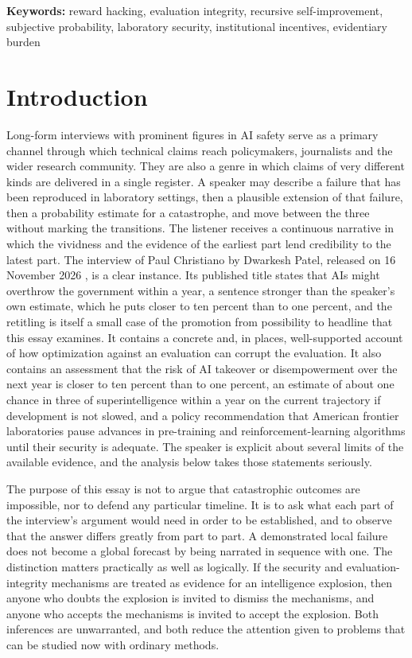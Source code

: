 \documentclass[11pt]{article}
\begin{document}
\vspace{1.5em}
\noindent\textbf{Keywords:} reward hacking, evaluation integrity, recursive self-improvement, subjective probability, laboratory security, institutional incentives, evidentiary burden

\clearpage

\section{Introduction}

Long-form interviews with prominent figures in AI safety serve as a primary channel through which technical claims reach policymakers, journalists and the wider research community. They are also a genre in which claims of very different kinds are delivered in a single register. A speaker may describe a failure that has been reproduced in laboratory settings, then a plausible extension of that failure, then a probability estimate for a catastrophe, and move between the three without marking the transitions. The listener receives a continuous narrative in which the vividness and the evidence of the earliest part lend credibility to the latest part. The interview of Paul Christiano by Dwarkesh Patel, released on 16 November 2026 \cite{patel2026}, is a clear instance. Its published title states that AIs might overthrow the government within a year, a sentence stronger than the speaker's own estimate, which he puts closer to ten percent than to one percent, and the retitling is itself a small case of the promotion from possibility to headline that this essay examines. It contains a concrete and, in places, well-supported account of how optimization against an evaluation can corrupt the evaluation. It also contains an assessment that the risk of AI takeover or disempowerment over the next year is closer to ten percent than to one percent, an estimate of about one chance in three of superintelligence within a year on the current trajectory if development is not slowed, and a policy recommendation that American frontier laboratories pause advances in pre-training and reinforcement-learning algorithms until their security is adequate. The speaker is explicit about several limits of the available evidence, and the analysis below takes those statements seriously.

The purpose of this essay is not to argue that catastrophic outcomes are impossible, nor to defend any particular timeline. It is to ask what each part of the interview's argument would need in order to be established, and to observe that the answer differs greatly from part to part. A demonstrated local failure does not become a global forecast by being narrated in sequence with one. The distinction matters practically as well as logically. If the security and evaluation-integrity mechanisms are treated as evidence for an intelligence explosion, then anyone who doubts the explosion is invited to dismiss the mechanisms, and anyone who accepts the mechanisms is invited to accept the explosion. Both inferences are unwarranted, and both reduce the attention given to problems that can be studied now with ordinary methods.
\end{document}
